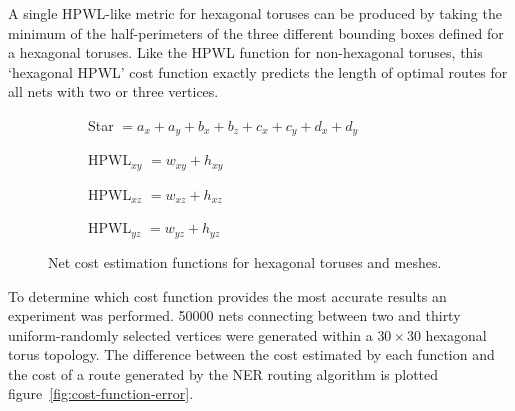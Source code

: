 				A single HPWL-like metric for hexagonal toruses can be produced by
				taking the minimum of the half-perimeters of the three different
				bounding boxes defined for a hexagonal toruses. Like the HPWL function
				for non-hexagonal toruses, this `hexagonal HPWL' cost function exactly
				predicts the length of optimal routes for all nets with two or three
				vertices.
				
				\begin{figure}
					\center
					\begin{subfigure}[b]{\linewidth}
						\center
						
						\caption{Star $= a_x + a_y + b_x + b_z + c_x + c_y + d_x + d_y$}
						\label{fig:cost-function-star}
					\end{subfigure}
					
					\vspace*{1.5em}
					
					\begin{subfigure}[b]{0.32\linewidth}
						\center
						
						\caption{HPWL$_{xy}$ $= w_{xy} + h_{xy}$}
						\label{fig:cost-function-hpwl-xy}
					\end{subfigure}
					\begin{subfigure}[b]{0.32\linewidth}
						\center
						
						\caption{HPWL$_{xz}$ $= w_{xz} + h_{xz}$}
						\label{fig:cost-function-hpwl-xz}
					\end{subfigure}
					\begin{subfigure}[b]{0.32\linewidth}
						\center
						
						\caption{HPWL$_{yz}$ $= w_{yz} + h_{yz}$}
						\label{fig:cost-function-hpwl-yz}
					\end{subfigure}
					
					\caption[Net cost estimation functions for hexagonal toruses.]%
					{Net cost estimation functions for hexagonal toruses and meshes.}
					\label{fig:cost-function}
				\end{figure}
				
				To determine which cost function provides the most accurate results an
				experiment was performed. \num{50000} nets connecting between two and
				thirty uniform-randomly selected vertices were generated within a
				$30\times30$ hexagonal torus topology. The difference between the cost
				estimated by each function and the cost of a route generated by the NER
				routing algorithm is plotted figure~\ref{fig:cost-function-error}.
				
